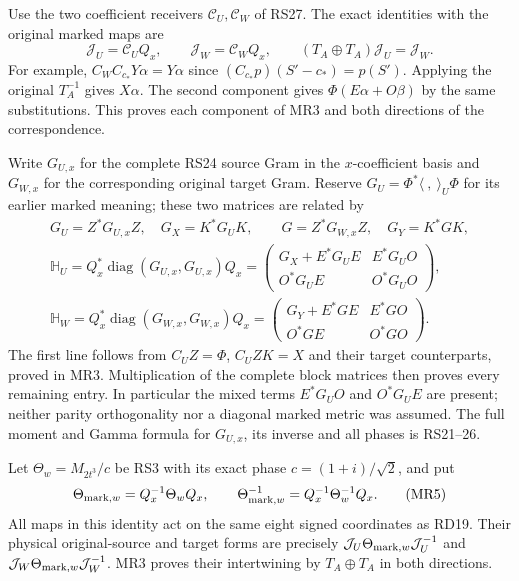 \documentclass[11pt]{article}
\begin{document}
Use the two coefficient receivers $\mathcal C_U,\mathcal C_W$
of RS27. The exact identities with the original marked maps are
\begin{equation}
 \mathcal J_U=\mathcal C_UQ_x,\qquad
 \mathcal J_W=\mathcal C_WQ_x,\qquad
 (T_A\oplus T_A)\mathcal J_U=\mathcal J_W.
 \tag{MR3}
\end{equation}
For example, $C_WC_{c_*}Y\alpha=Y\alpha$ since
$(C_{c_*}p)(S'-c_*)=p(S')$. Applying the original $T_A^{-1}$
gives $X\alpha$. The second component gives
$\Phi(E\alpha+O\beta)$ by the same substitutions. This proves
each component of MR3 and both directions of the correspondence.

Write $G_{U,x}$ for the complete RS24 source Gram in the
$x$-coefficient basis and $G_{W,x}$ for the corresponding
original target Gram. Reserve $G_U=\Phi^*\langle\ ,\ \rangle_U\Phi$
for its earlier marked meaning; these two matrices are related by
\begin{equation}
 \begin{gathered}
 G_U=Z^*G_{U,x}Z,\quad G_X=K^*G_UK,\qquad
 G=Z^*G_{W,x}Z,\quad G_Y=K^*GK,\\
 \mathbb H_U=Q_x^*\operatorname{diag}(G_{U,x},G_{U,x})Q_x
 =\begin{pmatrix}
 G_X+E^*G_UE&E^*G_UO\\O^*G_UE&O^*G_UO
 \end{pmatrix},\\
 \mathbb H_W=Q_x^*\operatorname{diag}(G_{W,x},G_{W,x})Q_x
 =\begin{pmatrix}
 G_Y+E^*GE&E^*GO\\O^*GE&O^*GO
 \end{pmatrix}.
 \end{gathered}\tag{MR4}
\end{equation}
The first line follows from $C_UZ=\Phi$, $C_UZK=X$ and
their target counterparts, proved in MR3. Multiplication
of the complete block matrices then proves every remaining
entry. In particular the mixed terms $E^*G_UO$ and $O^*G_UE$
are present; neither parity orthogonality nor a diagonal
marked metric was assumed. The full moment and Gamma formula
for $G_{U,x}$, its inverse and all phases is RS21--26.

Let $\Theta_w=M_{2t^3}/c$ be RS3 with its exact phase
$c=(1+i)/\sqrt2$, and put
\begin{equation}
 \Theta_{{\rm mark},w}=Q_x^{-1}\Theta_wQ_x,\qquad
 \Theta_{{\rm mark},w}^{-1}=Q_x^{-1}\Theta_w^{-1}Q_x.
 \tag{MR5}
\end{equation}
All maps in this identity act on the same eight signed
coordinates as RD19. Their physical original-source and
target forms are precisely $\mathcal J_U\Theta_{{\rm mark},w}
\mathcal J_U^{-1}$ and $\mathcal J_W\Theta_{{\rm mark},w}
\mathcal J_W^{-1}$. MR3 proves their intertwining by
$T_A\oplus T_A$ in both directions.
\end{document}
